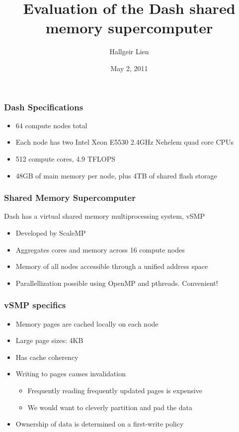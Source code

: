 \documentclass{beamer}
\title{Evaluation of the Dash shared memory supercomputer}
\author{Hallgeir Lien}
\date{May 2, 2011}
\begin{document}
\maketitle

\begin{frame}
\frametitle{Dash Specifications}
\begin{itemize}
\item 64 compute nodes total
\pause
\item Each node has two Intel Xeon E5530 2.4GHz Nehelem quad core CPUs
\pause
\item 512 compute cores, 4.9 TFLOPS
\pause
\item 48GB of main memory per node, plus 4TB of shared flash storage
\pause
\end{itemize}
\end{frame}

\begin{frame}
\frametitle{Shared Memory Supercomputer}
Dash has a virtual shared memory multiprocessing system, vSMP
\begin{itemize}
\item Developed by ScaleMP
\pause
\item Aggregates cores and memory across 16 compute nodes
\pause
\item Memory of all nodes accessible through a unified address space
\pause
\item Parallellization possible using OpenMP and pthreads. Convenient!
\end{itemize}
\end{frame}

\begin{frame}
\frametitle{vSMP specifics}
\begin{itemize}
\item Memory pages are cached locally on each node
\pause
\item Large page sizes: 4KB
\pause
\item Has cache coherency
\pause
\item Writing to pages causes invalidation
    \begin{itemize}
        \item Frequently reading frequently updated pages is expensive
        \pause
        \item We would want to cleverly partition and pad the data
    \end{itemize}
\pause
\item Ownership of data is determined on a first-write policy
\end{itemize}
\end{frame}
\end{document}
